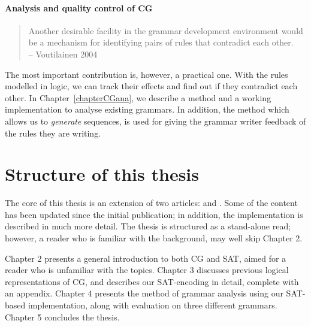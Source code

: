 \paragraph{Analysis and quality control of CG}

\begin{quote}
Another desirable facility in the grammar development environment would be a mechanism for identifying pairs of rules that contradict each other. \\
-- Voutilainen 2004
\end{quote}

The most important contribution is, however, a practical one. 
With the rules modelled in logic, we can track their effects and 
find out if they contradict each other.
In Chapter~\ref{chapterCGana}, we describe a method and a working 
implementation to analyse existing grammars. In addition, the method which allows
us to \emph{generate} sequences, is used for giving the grammar writer feedback of the rules they are writing.







\section{Structure of this thesis}

The core of this thesis is an extension of two articles: \cite{listenmaa_claessen2015} and . Some of the content has been updated since the initial publication; in addition, the implementation is described in much more detail. The thesis is structured as a stand-alone read; however, a reader who is familiar with the background, may well skip Chapter 2.

Chapter 2 presents a general introduction to both CG and SAT, aimed for a reader who is unfamiliar with the topics.
Chapter 3 discusses previous logical representations of CG, and describes our SAT-encoding in detail, complete with an appendix.
Chapter 4 presents the method of grammar analysis using our SAT-based implementation, along with evaluation on three different grammars.
Chapter 5 concludes the thesis.
